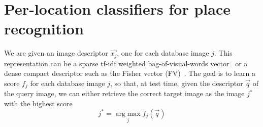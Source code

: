 



\section{Per-location classifiers for place recognition}
\label{sec:classifiers}
   We are given an image descriptor $\vec{x_j}$, one for each database image $j$. This representation can be a sparse tf-idf weighted bag-of-visual-words vector~\cite{Sivic03} or a dense compact descriptor such as the Fisher vector (FV)~\cite{Jegou12}. The goal is to learn a score $f_j$ for each database image $j$, so that, at test time, given the descriptor $\vec{q}$ of the query image, we can either retrieve the correct target image as the image $j^*$ with the highest score 
   \begin{equation}
   \label{eq:class}
    j^*=\operatorname*{arg\;max}_{j} f_j(\vec{q}) 
   \end{equation}

